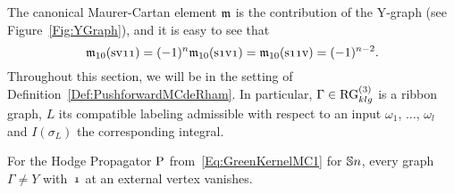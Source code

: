 \documentclass[\MainFolder/Text.tex]{subfiles}
\begin{document}
The canonical Maurer-Cartan element $\mathfrak{m}$ is the contribution of the Y-graph (see Figure~\ref{Fig:YGraph}), and it is easy to see that
\begin{equation*}
 \MC_{10}(\Susp \NVol \NOne \NOne ) = (-1)^n \MC_{10}(\Susp\NOne \NVol \NOne) = \MC_{10}(\Susp \NOne \NOne \NVol) = (-1)^{n-2}.
\end{equation*}
Throughout this section, we will be in the setting of Definition~\ref{Def:PushforwardMCdeRham}. In particular, $\Gamma \in \mathrm{RG}^{(3)}_{klg}$ is a ribbon graph, $L$ its compatible labeling admissible with respect to an input $\omega_1$, $\dotsc$, $\omega_l$ and $I(\sigma_L)$ the corresponding integral.
\begin{Lemma} \label{Lemma:ABVanishing}
For the Hodge Propagator $\mathrm{P}$ from~\eqref{Eq:GreenKernelMC1} for $\mathbb{S}{n}$, every graph $\Gamma \neq Y$ with~$\NOne$ at an external vertex vanishes.
\end{Lemma}
\end{document}
